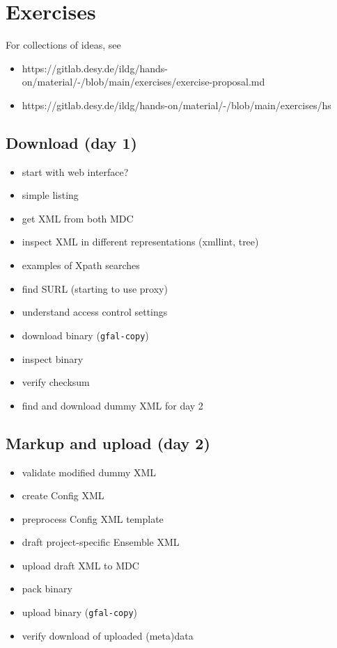 \documentclass{article}
\begin{document}
\section{Exercises}
For collections of ideas, see
\begin{itemize}
    \item https://gitlab.desy.de/ildg/hands-on/material/-/blob/main/exercises/exercise-proposal.md
    \item https://gitlab.desy.de/ildg/hands-on/material/-/blob/main/exercises/hs
\end{itemize}
\subsection{Download (day 1)}
\begin{itemize}
    \item start with web interface?
    \item simple listing
    \item get XML from both MDC
    \item inspect XML in different representations (xmllint, tree)
    \item examples of Xpath searches
    \item find SURL (starting to use proxy)
    \item understand access control settings
    \item download binary ({\tt gfal-copy})
    \item inspect binary
    \item verify checksum
    \item find and download dummy XML for day 2
\end{itemize}

\subsection{Markup and upload (day 2)}
\begin{itemize}
    \item validate modified dummy XML
    \item create Config XML
    \item preprocess Config XML template
    \item draft project-specific Ensemble XML
    \item upload draft XML to MDC
    \item pack binary
    \item upload binary ({\tt gfal-copy})
    \item verify download of uploaded (meta)data
\end{itemize}
\end{document}
